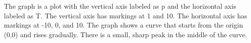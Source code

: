 The graph is a plot with the vertical axis labeled as p and the horizontal axis labeled as T. The vertical axis has markings at 1 and 10. The horizontal axis has markings at -10, 0, and 10. The graph shows a curve that starts from the origin (0,0) and rises gradually. There is a small, sharp peak in the middle of the curve.